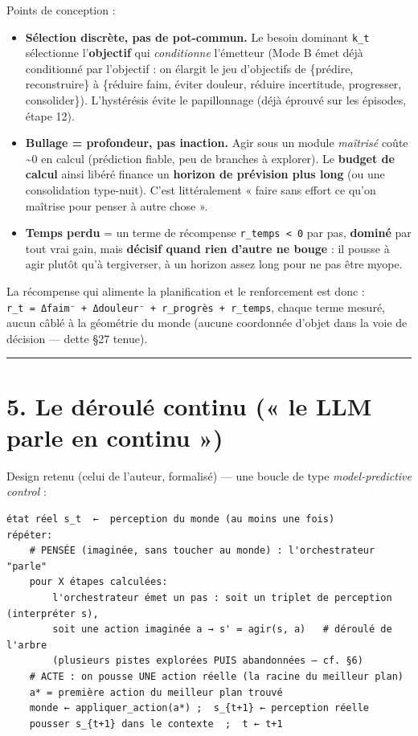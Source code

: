 \documentclass[
  french,
  11pt,
]{article}
\providecommand{\tightlist}{%
  \setlength{\itemsep}{0pt}\setlength{\parskip}{0pt}}
\begin{document}
Points de conception :

\begin{itemize}
\tightlist
\item
  \textbf{Sélection discrète, pas de pot-commun.} Le besoin dominant
  \texttt{k\_t} sélectionne l'\textbf{objectif} qui \emph{conditionne}
  l'émetteur (Mode B émet déjà conditionné par l'objectif : on élargit
  le jeu d'objectifs de \{prédire, reconstruire\} à \{réduire faim,
  éviter douleur, réduire incertitude, progresser, consolider\}).
  L'hystérésis évite le papillonnage (déjà éprouvé sur les épisodes,
  étape 12).
\item
  \textbf{Bullage = profondeur, pas inaction.} Agir sous un module
  \emph{maîtrisé} coûte \textasciitilde0 en calcul (prédiction fiable,
  peu de branches à explorer). Le \textbf{budget de calcul} ainsi libéré
  finance un \textbf{horizon de prévision plus long} (ou une
  consolidation type-nuit). C'est littéralement « faire sans effort ce
  qu'on maîtrise pour penser à autre chose ».
\item
  \textbf{Temps perdu} = un terme de récompense
  \texttt{r\_temps\ \textless{}\ 0} par pas, \textbf{dominé} par tout
  vrai gain, mais \textbf{décisif quand rien d'autre ne bouge} : il
  pousse à agir plutôt qu'à tergiverser, à un horizon assez long pour ne
  pas être myope.
\end{itemize}

La récompense qui alimente la planification et le renforcement est donc
: \texttt{r\_t\ =\ Δfaim⁻\ +\ Δdouleur⁻\ +\ r\_progrès\ +\ r\_temps},
chaque terme mesuré, aucun câblé à la géométrie du monde (aucune
coordonnée d'objet dans la voie de décision --- dette §27 tenue).

\begin{center}\rule{0.5\linewidth}{0.5pt}\end{center}

\section{5. Le déroulé continu (« le LLM parle en continu
»)}\label{le-duxe9rouluxe9-continu-le-llm-parle-en-continu}

Design retenu (celui de l'auteur, formalisé) --- une boucle de type
\emph{model-predictive control} :

\begin{verbatim}
état réel s_t  ←  perception du monde (au moins une fois)
répéter:
    # PENSÉE (imaginée, sans toucher au monde) : l'orchestrateur "parle"
    pour X étapes calculées:
        l'orchestrateur émet un pas : soit un triplet de perception (interpréter s),
        soit une action imaginée a → s' = agir(s, a)   # déroulé de l'arbre
        (plusieurs pistes explorées PUIS abandonnées — cf. §6)
    # ACTE : on pousse UNE action réelle (la racine du meilleur plan)
    a* = première action du meilleur plan trouvé
    monde ← appliquer_action(a*) ;  s_{t+1} ← perception réelle
    pousser s_{t+1} dans le contexte  ;  t ← t+1
\end{verbatim}
\end{document}
